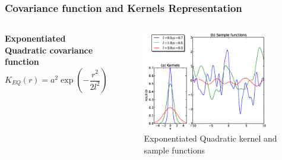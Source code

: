 \documentclass{beamer}
\begin{document}

\begin{frame}
\frametitle{Covariance function and Kernels Representation}

\begin{columns}[c] 
\textbf{Exponentiated Quadratic covariance function}
\begin{equation} \label{eq:EQ_cov}
K_{EQ}(r)= a^2 \exp \left(-\frac{r^2}{2l^2}\right)
\end{equation}
\begin{figure}[t]
	\centering
		\includegraphics[width=0.9\textwidth,keepaspectratio]{diagrams/SE_cov.eps}
	\caption[Exponentiated Quadratic kernel and sample functions]
		{Exponentiated Quadratic kernel and sample functions}
	\label{fig:Exponentiated_Quadratic_covariance}
\end{figure}


\end{columns}
\end{frame}
\end{document}
